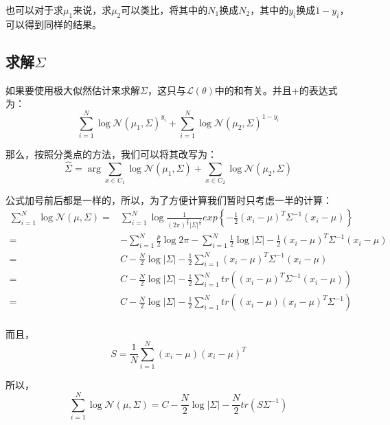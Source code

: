 \documentclass[a4paper]{article}
\begin{document}
也可以对于求$\mu_1$来说，求$\mu_2$可以类比，将其中的$N_1$换成$N_2$，其中的$y_i$换成$1-y_i$，可以得到同样的结果。

\subsection{求解$\Sigma$}
如果要使用极大似然估计来求解$\Sigma$，这只与$\mathcal{L}(\theta)$中的和有关。并且+的表达式为：
\begin{equation}
    \sum_{i=1}^N \log \mathcal{N}(\mu_1, \Sigma)^{y_i} + \sum_{i=1}^N \log \mathcal{N}(\mu_2, \Sigma)^{1-y_i}
\end{equation}

那么，按照分类点的方法，我们可以将其改写为：
\begin{equation}
    \hat{\Sigma} = \mathop{\arg\min_{\Sigma}}  \sum_{x\in C_1} \log \mathcal{N}(\mu_1, \Sigma) + \sum_{x\in C_2} \log \mathcal{N}(\mu_2, \Sigma)
\end{equation}

公式加号前后都是一样的，所以，为了方便计算我们暂时只考虑一半的计算：
\begin{equation}
    \begin{split}
        \sum_{i=1}^N \log \mathcal{N}(\mu, \Sigma) 
        = & \sum_{i=1}^N\log \frac{1}{(2\pi)^{\frac{p}{2}}|\Sigma|^{\frac{1}{2}}}exp\left\{ -\frac{1}{2}(x_i-\mu)^T\Sigma^{-1}(x_i-\mu) \right\} \\
        = & - \sum_{i=1}^N \frac{p}{2} \log 2\pi - \sum_{i=1}^N \frac{1}{2} \log |\Sigma| -\frac{1}{2}(x_i-\mu)^T\Sigma^{-1}(x_i-\mu) \\
        = & C -  \frac{N}{2} \log |\Sigma|  -\frac{1}{2}\sum_{i=1}^{N}(x_i-\mu)^T\Sigma^{-1}(x_i-\mu) \\ 
        = & C -  \frac{N}{2} \log |\Sigma|  -\frac{1}{2}\sum_{i=1}^{N}tr\left((x_i-\mu)^T\Sigma^{-1}(x_i-\mu)\right) \\
        = & C -  \frac{N}{2} \log |\Sigma|  -\frac{1}{2}\sum_{i=1}^{N}tr\left((x_i-\mu)(x_i-\mu)^T\Sigma^{-1} \right) \\
    \end{split}
\end{equation}

而且，
\begin{equation}
    S = \frac{1}{N}\sum_{i=1}^{N} (x_i-\mu)(x_i-\mu)^T
\end{equation}

所以，
\begin{equation}
    \sum_{i=1}^N \log \mathcal{N}(\mu, \Sigma) = C - \frac{N}{2} \log |\Sigma|  -\frac{N}{2}tr(S\Sigma^{-1})
\end{equation}
\end{document}
